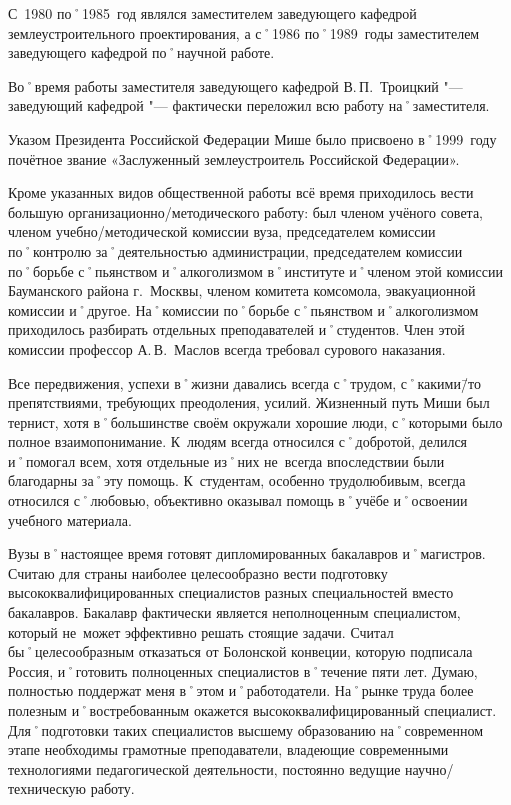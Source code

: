 С~1980 по˚1985~год являлся заместителем заведующего кафедрой землеустроительного проектирования, а с˚1986 по˚1989~годы заместителем заведующего кафедрой по˚научной работе.

Во˚время работы заместителя заведующего кафедрой В.\,П.~Троицкий "--- заведующий кафедрой "--- фактически переложил всю работу на˚заместителя.

Указом Президента Российской Федерации Мише было присвоено в˚1999~году почётное звание «Заслуженный землеустроитель Российской Федерации». 

Кроме указанных видов общественной работы всё время приходилось вести большую организационно\-/методического работу: был членом учёного совета, членом учебно\-/методической комиссии вуза, председателем комиссии по˚контролю за˚деятельностью администрации, председателем комиссии по˚борьбе с˚пьянством и˚алкоголизмом в˚институте и˚членом этой комиссии Бауманского района г.~Москвы, членом комитета комсомола, эвакуационной комиссии и˚другое. На˚комиссии по˚борьбе с˚пьянством и˚алкоголизмом приходилось разбирать отдельных преподавателей и˚студентов. Член этой комиссии профессор А.\,В.~Маслов всегда требовал сурового наказания.

Все передвижения, успехи в˚жизни давались всегда с˚трудом, с˚какими\=/то препятствиями, требующих преодоления, усилий. Жизненный путь Миши был тернист, хотя в˚большинстве своём окружали  хорошие люди, с˚которыми было полное взаимопонимание. К~людям всегда относился с˚добротой, делился и˚помогал всем, хотя отдельные из˚них не~всегда впоследствии были благодарны за˚эту помощь. К~студентам, особенно трудолюбивым, всегда относился с˚любовью, объективно оказывал помощь в˚учёбе и˚освоении учебного материала.

Вузы в˚настоящее время готовят дипломированных бакалавров и˚магистров. Считаю для страны наиболее целесообразно вести подготовку высококвалифицированных специалистов разных специальностей вместо бакалавров. Бакалавр фактически является неполноценным специалистом, который не~может эффективно решать стоящие задачи. Считал бы˚целесообразным отказаться от Болонской конвеции, которую подписала Россия, и˚готовить полноценных специалистов в˚течение пяти лет. Думаю, полностью поддержат меня в˚этом и˚работодатели. На˚рынке труда более полезным и˚востребованным окажется высококвалифицированный специалист. Для˚подготовки таких специалистов высшему образованию на˚современном этапе необходимы грамотные преподаватели, владеющие современными технологиями педагогической деятельности, постоянно ведущие научно\-/техническую работу.


